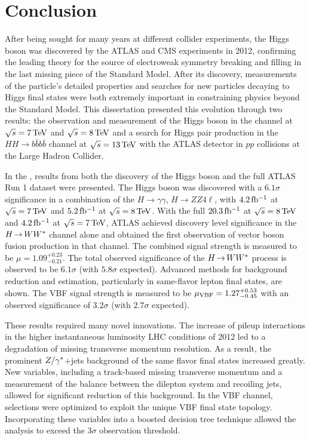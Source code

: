 \chapter{Conclusion}
\label{conclusion}

After being sought for many years at different collider experiments, the Higgs boson was discovered by the ATLAS and CMS experiments in 2012, confirming the leading theory for the source of electroweak symmetry breaking and filling in the last missing piece of the Standard Model. After its discovery, measurements of the particle's detailed properties and searches for new particles decaying to Higgs final states were both extremely important in constraining physics beyond the Standard Model. This dissertation presented this evolution through two results: the observation and measurement of the Higgs boson in the \HWWfull channel at $\sqrt{s} = 7 \TeV$ and $\sqrt{s} = 8 \TeV$ and a search for Higgs pair production in the $HH\to b\bar{b}b\bar{b}$ channel at $\sqrt{s} = 13 \TeV$ with the ATLAS detector in $pp$ collisions at the Large Hadron Collider.

In the \HWWfull, results from both the discovery of the Higgs boson and the full ATLAS Run 1 dataset were presented. The Higgs boson was discovered with a $6.1\sigma$ significance in a combination of the $H\to\gamma\gamma$, $H\to ZZ 4\ell$, \HWWfull with $4.2\mbox{\,fb$^{-1}$}$ at $\sqrt{s} = 7 \TeV$ and $5.2\mbox{\,fb$^{-1}$}$ at $\sqrt{s} = 8 \TeV$. With the full $20.3\mbox{\,fb$^{-1}$}$ at $\sqrt{s} =  8 \TeV$ and $4.2\mbox{\,fb$^{-1}$}$ at $\sqrt{s} = 7 \TeV$, ATLAS achieved discovery level significance in the $H{\,{\rightarrow}\,}WW^\ast$ channel alone and obtained the first observation of vector boson fusion production in that channel. The combined signal strength is measured to be $\mu = 1.09^{+0.23}_{-0.21}$. The total observed significance of the $H{\,{\rightarrow}\,}WW^\ast$ process is observed to be $6.1\sigma$ (with $5.8 \sigma$ expected). Advanced methods for background reduction and estimation, particularly in same-flavor lepton final states, are shown. The VBF signal strength is measured to be $\mu_{\rm VBF} = 1.27^{+0.53}_{-0.45}$ with an observed significance of $3.2\sigma$ (with $2.7 \sigma$ expected). 

These results required many novel innovations. The increase of pileup interactions in the higher instantaneous luminosity LHC conditions of 2012 led to a degradation of missing transverse momentum resolution. As a result, the prominent $Z/\gamma^{\ast}$+jets background of the same flavor \HWWfull final states increased greatly. New variables, including a track-based missing transverse momentum and a measurement of the balance between the dilepton system and recoiling jets, allowed for significant reduction of this background. In the VBF channel, selections were optimized to exploit the unique VBF final state topology. Incorporating these variables into a boosted decision tree technique allowed the analysis to exceed the $3\sigma$ observation threshold.

